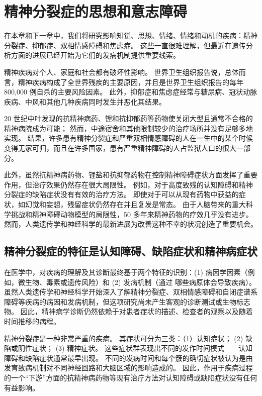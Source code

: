 \chapter{精神分裂症的思想和意志障碍} \label{chap:chap60}

在本章和下一章中，我们将研究影响知觉、思想、情绪、情绪和动机的疾病：精神分裂症、抑郁症、双相情感障碍和焦虑症。 这些一直很难理解，但最近在遗传分析方面的进展已经开始为它们的发病机制提供重要线索。

精神疾病对个人、家庭和社会都有破坏性影响。 世界卫生组织报告说，总体而言，精神疾病构成了全世界残疾的主要原因，并且是世界卫生组织报告的每年 800,000 例自杀的主要风险因素。 此外，抑郁症和焦虑症经常与糖尿病、冠状动脉疾病、中风和其他几种疾病同时发生并恶化其结果。

20 世纪中叶发现的抗精神病药、锂和抗抑郁药等药物使关闭大型且通常不合格的精神病院成为可能； 然而，中途宿舍和其他限制较少的治疗场所并没有足够多地实现。 结果，许多患有精神分裂症和严重双相情感障碍的人在一生中的某个时候变得无家可归，而且在许多国家，患有严重精神障碍的人占监狱人口的很大一部分。

此外，虽然抗精神病药物、锂盐和抗抑郁药物在控制精神障碍症状方面发挥了重要作用，但治疗效果仍然存在很大局限性。 例如，对于高度致残的认知障碍和精神分裂症的缺陷症状没有有效的治疗方法。 即使对于可以从现有药物中获益的症状，如幻觉和妄想，残留症状仍然存在并且复发是常态。 由于人脑带来的重大科学挑战和精神障碍动物模型的局限性，50 多年来精神药物的疗效几乎没有进步。 然而，人类遗传学和神经科学的最新进展为改善这种不幸的状况创造了重要机会。

\section{精神分裂症的特征是认知障碍、缺陷症状和精神病症状}
在医学中，对疾病的理解及其诊断最终基于两个特征的识别：(1) 病因学因素（例如，微生物、毒素或遗传风险）和 (2) 发病机制（通过 哪些病原体会导致疾病）。 虽然人类遗传学和神经科学开始深入了解精神分裂症、双相情感障碍和自闭症谱系障碍等疾病的病因和发病机制，但这项研究尚未产生客观的诊断测试或生物标志物。 因此，精神病学诊断仍然依赖于对患者症状的描述、检查者的观察以及随着时间推移的病程。

精神分裂症是一种非常严重的疾病。 其症状可分为三类：（1）认知症状； (2) 缺陷或阴性症状； (3) 精神症状。 这些症状群表现出不同的发作时间模式——认知障碍和缺陷症状通常最早出现。 不同的发病时间和每个簇的确切症状被认为是由发育致病机制对不同神经回路和大脑区域的影响造成的。 因此，作用于疾病过程的一个“下游”方面的抗精神病药物等现有治疗方法对认知障碍或缺陷症状没有任何有益影响。

